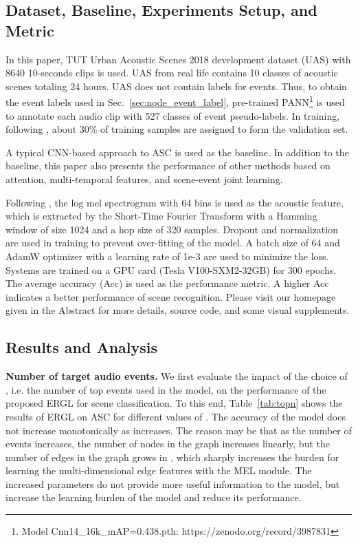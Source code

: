 \documentclass{article}
\begin{document}
\subsection{Dataset, Baseline, Experiments Setup, and Metric}


In this paper, TUT Urban Acoustic Scenes 2018 development dataset (UAS) \cite{DCASE2018} with 8640 10-seconds clips is used. 
UAS from real life contains 10 classes of acoustic scenes totaling 24 hours. 
UAS does not contain labels for events. 
Thus, to obtain the event labels used in Sec.~\ref{sec:node_event_label}, pre-trained PANN\protect\footnote{Model Cnn14\_16k\_mAP=0.438.pth: https://zenodo.org/record/3987831} \cite{kong2020panns} is used to annotate each audio clip with 527 classes of event pseudo-labels.
In training, following \cite{DCASE2018}, 
about 30\% of training samples are assigned to form the validation set.

 

A typical CNN-based approach \cite{DCASE2018} to ASC is used as the baseline. 
In addition to the baseline, this paper also presents the performance of other methods based on attention, multi-temporal features, and scene-event joint learning.

 
 

Following \cite{kong2020panns}, the log mel spectrogram with 64 bins is used as the acoustic feature, which is extracted by the Short-Time Fourier Transform with a Hamming window of size 1024 and a hop size of 320 samples. 
Dropout and normalization are used in training to prevent over-fitting of the model. 
A batch size of 64 and AdamW optimizer \cite{adamw} with a learning rate of 1e-3 are used to minimize the loss. 
Systems are trained on a GPU card (Tesla V100-SXM2-32GB) for 300 epochs.
The average accuracy (Acc) \cite{acoustic_scene} is used as the performance metric.
A higher Acc indicates a better performance of scene recognition. 
Please visit our homepage given in the Abstract for more details, source code, and some visual supplements. 




\vspace{-0.2cm}
\subsection{Results and Analysis}

\vspace{-0.2cm}
\textbf{Number  of target audio events.}
We first evaluate the impact of the choice of , i.e.  the number of top events used in the model,  on the performance of the proposed ERGL for scene classification.
To this end, Table~\ref{tab:topn} shows the results of ERGL on ASC for different values of .
The accuracy of the model does not increase monotonically as  increases. 
The reason may be that as the number of events  increases, the  number of nodes in the graph increases linearly, but the number of edges in the graph grows in , which sharply increases the burden for learning the multi-dimensional edge features with the MEL module. 
The increased parameters do not provide more useful information to the model, but increase the learning burden of the model and reduce its performance.
\end{document}
